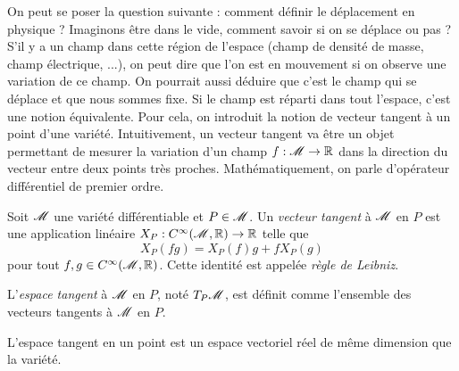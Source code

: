 \documentclass[a4paper,11pt]{report}
\begin{document}
                On peut se poser la question suivante : comment définir le déplacement en physique ? Imaginons être dans le vide, comment savoir si on se déplace ou pas ? S'il y a un champ dans cette région de l'espace (champ de densité de masse, champ électrique, ...), on peut dire que l'on est en mouvement si on observe une variation de ce champ. On pourrait aussi déduire que c'est le champ qui se déplace et que nous sommes fixe.  Si le champ est réparti dans tout l'espace, c'est une notion équivalente. Pour cela, on introduit la notion de vecteur tangent à un point d'une variété. Intuitivement, un vecteur tangent va être un objet permettant de mesurer la variation d'un champ $f:\mathscr{M}\to\mathbb{R}$ dans la direction du vecteur entre deux points très proches. Mathématiquement, on parle d'opérateur différentiel de premier ordre.
                
                \begin{defn}
                    Soit $\mathscr{M}$ une variété différentiable et $P\in\mathscr{M}$. Un \textit{vecteur tangent} à $\mathscr{M}$ en $P$ est une application linéaire $X_P:C^\infty(\mathscr{M},\mathbb{R})\to\mathbb{R}$ telle que
                    \begin{equation}
                        X_P(fg) = X_P(f)g+fX_P(g)
                    \end{equation}
                    pour tout $f,g\in C^\infty(\mathscr{M},\mathbb{R})$. Cette identité est appelée \textit{règle de Leibniz}.
                \end{defn}
                
                \begin{defn}
                    L'\textit{espace tangent} à $\mathscr{M}$ en $P$, noté $T_P\mathscr{M}$, est définit comme l'ensemble des vecteurs tangents à $\mathscr{M}$ en $P$.
                \end{defn}
                
                \begin{prop}
                \begin{leftbar}
                    L'espace tangent en un point est un espace vectoriel réel de même dimension que la variété.
                \end{leftbar}
                \end{prop}
                
\end{document}
